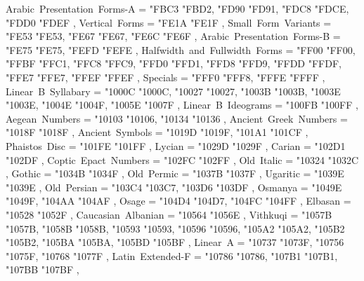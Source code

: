 {    Arabic~Presentation~Forms-A                    = { {"FBC3} {"FBD2}, {"FD90} {"FD91}, {"FDC8} {"FDCE}, {"FDD0} {"FDEF} },
    Vertical~Forms                                 = { {"FE1A} {"FE1F} },
    Small~Form~Variants                            = { {"FE53} {"FE53}, {"FE67} {"FE67}, {"FE6C} {"FE6F} },
    Arabic~Presentation~Forms-B                    = { {"FE75} {"FE75}, {"FEFD} {"FEFE} },
    Halfwidth~and~Fullwidth~Forms                  = { {"FF00} {"FF00}, {"FFBF} {"FFC1}, {"FFC8} {"FFC9}, {"FFD0} {"FFD1}, {"FFD8} {"FFD9}, {"FFDD} {"FFDF}, {"FFE7} {"FFE7}, {"FFEF} {"FFEF} },
    Specials                                       = { {"FFF0} {"FFF8}, {"FFFE} {"FFFF} },
    Linear~B~Syllabary                             = { {"1000C} {"1000C}, {"10027} {"10027}, {"1003B} {"1003B}, {"1003E} {"1003E}, {"1004E} {"1004F}, {"1005E} {"1007F} },
    Linear~B~Ideograms                             = { {"100FB} {"100FF} },
    Aegean~Numbers                                 = { {"10103} {"10106}, {"10134} {"10136} },
    Ancient~Greek~Numbers                          = { {"1018F} {"1018F} },
    Ancient~Symbols                                = { {"1019D} {"1019F}, {"101A1} {"101CF} },
    Phaistos~Disc                                  = { {"101FE} {"101FF} },
    Lycian                                         = { {"1029D} {"1029F} },
    Carian                                         = { {"102D1} {"102DF} },
    Coptic~Epact~Numbers                           = { {"102FC} {"102FF} },
    Old~Italic                                     = { {"10324} {"1032C} },
    Gothic                                         = { {"1034B} {"1034F} },
    Old~Permic                                     = { {"1037B} {"1037F} },
    Ugaritic                                       = { {"1039E} {"1039E} },
    Old~Persian                                    = { {"103C4} {"103C7}, {"103D6} {"103DF} },
    Osmanya                                        = { {"1049E} {"1049F}, {"104AA} {"104AF} },
    Osage                                          = { {"104D4} {"104D7}, {"104FC} {"104FF} },
    Elbasan                                        = { {"10528} {"1052F} },
    Caucasian~Albanian                             = { {"10564} {"1056E} },
    Vithkuqi                                       = { {"1057B} {"1057B}, {"1058B} {"1058B}, {"10593} {"10593}, {"10596} {"10596}, {"105A2} {"105A2}, {"105B2} {"105B2}, {"105BA} {"105BA}, {"105BD} {"105BF} },
    Linear~A                                       = { {"10737} {"1073F}, {"10756} {"1075F}, {"10768} {"1077F} },
    Latin~Extended-F                               = { {"10786} {"10786}, {"107B1} {"107B1}, {"107BB} {"107BF} },
}
